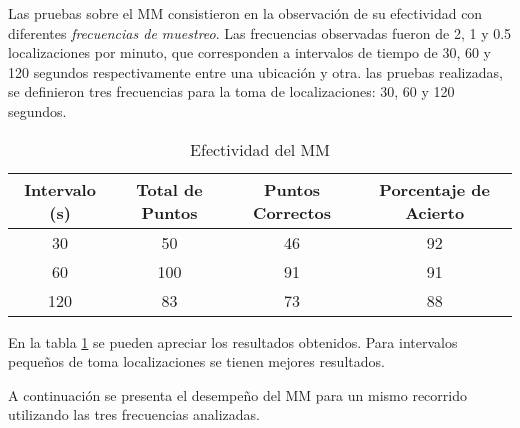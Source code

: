 Las pruebas sobre el MM consistieron en la observación de su efectividad con diferentes \emph{frecuencias de muestreo}. Las frecuencias observadas fueron de 2, 1 y 0.5 localizaciones por minuto, que corresponden a intervalos de tiempo de 30, 60 y 120 segundos respectivamente entre una ubicación y otra. las pruebas realizadas, se definieron  tres frecuencias para la toma de localizaciones: 30, 60 y 120 segundos. 

\begin{table}[ht]
	\caption{Efectividad del MM} 
	\centering
	\begin{tabular}{c c c c}
		\hline\hline
		Intervalo (s) & Total de Puntos & Puntos Correctos & Porcentaje de Acierto\\ [0.5ex]
		\hline
		30 & 50 & 46 & 92 \\
		60 & 100 & 91 & 91 \\
		120 & 83 & 73 & 88\\ [1ex]
		\hline
	\end{tabular}
	\label{table:map_matching}
\end{table}

En la tabla \ref{table:map_matching} se pueden apreciar los resultados obtenidos. Para intervalos pequeños de toma localizaciones  se tienen mejores resultados.

A continuación se presenta el desempeño del MM para un mismo recorrido utilizando las tres frecuencias analizadas. 



